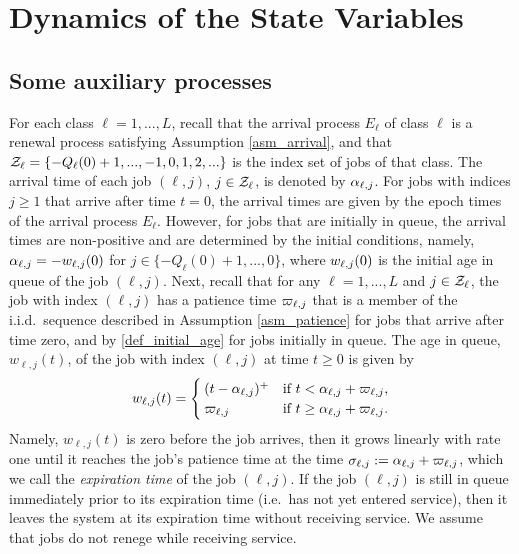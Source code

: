 \documentclass[stsy]{informs-stsy}
\begin{document}
\section{Dynamics of the State Variables}



\subsection{Some auxiliary processes}
For each class $\ell=1,...,L$, recall that the arrival process $E_\ell$ of class $\ell$ is a renewal process satisfying Assumption \ref{asm_arrival}, and that $\mathcal{Z}_\ell=\{-Q_\ell(0)+1,...,-1,0,1,2,...\}$ is the index set of jobs of that class. The arrival time of each job $(\ell,j)$, $j\in \mathcal{Z}_\ell$, is denoted by $\alpha_{\ell,j}$. For jobs with indices $j\geq1$ that arrive after time $t=0$, the arrival times are given by the epoch times of the arrival process $E_\ell$. However, for jobs  that are initially in queue, the arrival times are non-positive and are determined by the initial conditions, namely,  $\alpha_{\ell,j}=-w_{\ell,j}(0)$ for $j\in\{-Q_\ell(0)+1,...,0\}$, where $w_{\ell,j}(0)$ is the initial age in queue of the job $(\ell,j)$. Next, recall that for any $\ell=1,...,L$ and $j\in\mathcal{Z}_\ell$, the job with index $(\ell,j)$ has a patience time $\varpi_{\ell,j}$ that is a member of the i.i.d.\ sequence described in Assumption \ref{asm_patience} for jobs that arrive after time zero, and by \eqref{def_initial_age} for jobs initially in queue. The age in queue, $w_{\ell,j}(t)$, of the job with index $(\ell,j)$ at time $t\geq0$ is given by
\begin{equation}\label{def_w}
w_{\ell,j}(t)=
  \begin{cases} (t-\alpha_{\ell,j})^+ & \text{if }  t<\alpha_{\ell,j}+\varpi_{\ell,j},\\
  \varpi_{\ell,j}& \text{if }t\geq \alpha_{\ell,j}+\varpi_{\ell,j}.
  \end{cases}
\end{equation}
Namely, $w_{\ell,j}(t)$ is zero before the job arrives, then it grows linearly with rate one until it reaches the job's patience time at the time $\sigma_{\ell,j}:=\alpha_{\ell,j}+\varpi_{\ell,j}$, which we call the \textit{expiration time} of the job $(\ell,j)$. If the job $(\ell,j)$ is still in queue immediately prior to its expiration time (i.e.\ has not yet entered service), then it leaves the system at its expiration time without receiving service. We assume that jobs do not renege while receiving service. 
\end{document}

